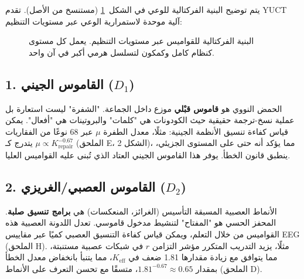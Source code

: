 \documentclass[12pt,a4paper]{article}
\newcommand{\eff}{\mathrm{eff}}
\newcommand{\Ke}{K_{\eff}}
\begin{document}
	يتم توضيح البنية الفركتالية للوعي في الشكل~\ref{fig:fractal_dict} (مستنسخ من الأصل). تقدم YUCT آلية موحدة لاستمرارية الوعي عبر مستويات التنظيم:
	
	\begin{figure}[htbp]
		\centering
		\caption{البنية الفركتالية للقواميس عبر مستويات التنظيم. يعمل كل مستوى كنظام كامل وكمكون لتسلسل هرمي أكبر في آن واحد.}
		\label{fig:fractal_dict}
	\end{figure}
	
	\subsection{1. القاموس الجيني (\(D_1\))}
	
	الحمض النووي هو \textbf{قاموس قبْلي} موزع داخل الجماعة. "الشفرة" ليست استعارة بل عملية نسخ-ترجمة حقيقية حيث الكودونات هي "كلمات" والبروتينات هي "أفعال". يمكن قياس كفاءة تنسيق الأنظمة الجينية: مثلًا، معدل الطفرة \(\mu\) عبر 68 نوعًا من الفقاريات يتدرج كـ \(\mu \propto K_{\text{repair}}^{-0.67}\) (الملحق E، الشكل 2)، مما يؤكد أنه حتى على المستوى الجزيئي، ينطبق قانون الخطأ. يوفر هذا القاموس الجيني العتاد الذي تُبنى عليه القواميس العليا.
	
	\subsection{2. القاموس العصبي/الغريزي (\(D_2\))}
	
	الأنماط العصبية المسبقة التأسيس (الغرائز، المنعكسات) هي \textbf{برامج تنسيق صلبة}. المحفز الحسي هو "المفتاح" لتنشيط مدخول قاموسي. تعدل اللدونة العصبية هذه القواميس من خلال التعلم، ويمكن قياس كفاءة التنسيق العصبي كميًا عبر مقاييس EEG (الملحق H). مثلًا، يزيد التدريب المتكرر مؤشر التزامن \(r\) في شبكات عصبية مستنبتة، مما يتوافق مع زيادة مقدارها 1.81 ضعف في \(\Ke\)، مما يتنبأ بانخفاض معدل الخطأ بمقدار \(1.81^{-0.67} \approx 0.65\)، متسقًا مع تحسن التعرف على الأنماط (الملحق D).
	
\end{document}

